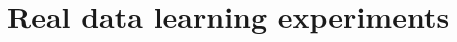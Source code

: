 \documentclass{article}
\theoremstyle{plain}
\theoremstyle{definition}
\theoremstyle{remark}
\begin{document}

\section{Real data learning experiments}

\end{document}
